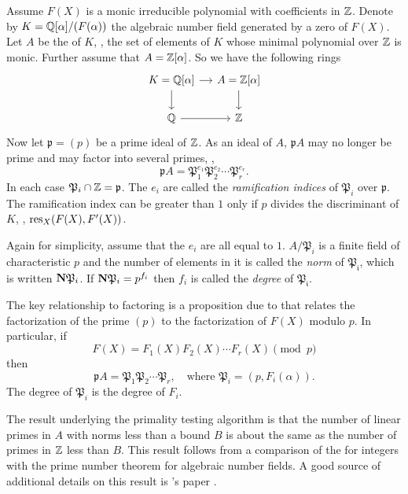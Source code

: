 Assume $F(X)$ is a monic irreducible polynomial with coefficients in
$\mathbb{Z}$.  Denote by $K = \mathbb{Q}[\alpha]/(F(\alpha))$ the algebraic number field
generated by a zero of $F(X)$.  Let $A$ be the 
of $K$, \ie, the set of elements of $K$ whose minimal polynomial over
$\mathbb{Z}$ is monic.  Further assume that $A = \mathbb{Z}[\alpha]$.  So we have the
following rings
\[
\begin{tikzcd}[column sep=small]
K =\Q[\alpha] \arrow{r}\arrow{d}   & A =\Z[\alpha]\arrow{d}\\
\Q\arrow{r} & \Z
\end{tikzcd}
\]
Now let $\mathfrak{p} = (p)$ be a prime ideal of $\mathbb{Z}$.  As an ideal of
$A$, $\mathfrak{p}A$ may no longer be prime and may factor into several
primes, \ie, 
\[
\mathfrak{p}A = \mathfrak{P}_1^{e_1} \mathfrak{P}_2^{e_2} \cdots \mathfrak{P}_r^{e_r}.
\]
In each case $\mathfrak{P}_i \cap \mathbb{Z} = \mathfrak{p}$.  The $e_i$ are called
the {\em ramification indices} of $\mathfrak{P}_i$
over $\mathfrak{p}$.  The ramification index can be greater than $1$ only
if $p$ divides the discriminant of $K$, \ie, $\mathop{\rm res}\nolimits_X(F(X), F'(X))$.

Again for simplicity, assume that the $e_i$ are all equal to $1$.
$A/\mathfrak{P}_i$ is a finite field of characteristic $p$ and the number
of elements in it is called the {\em norm} of $\mathfrak{P_i}$,
 which is written ${\bf N} \mathfrak{P}_i$.  If
${\bf N} \mathfrak{P}_i = p^{f_i}$ then $f_i$ is called the {\em degree}
of $\mathfrak{P_i}$.

The key relationship to factoring is a proposition due to {\Dedekind}
\cite{Dedekind78} that relates the factorization of the prime $(p)$ to the
factorization of $F(X)$ modulo $p$.  In particular, if
\[
F(X) = F_1(X) F_2(X) \cdots F_r(X) \pmod{p}
\]
then
\[
\mathfrak{p}A = \mathfrak{P}_1 \mathfrak{P}_2 \cdots \mathfrak{P}_r,
\quad\mbox{where $\mathfrak{P}_i = (p, F_i(\alpha))$.}
\]
The degree of $\mathfrak{P}_i$ is the degree of $F_i$.

The result underlying the primality testing algorithm is that the
number of linear primes in $A$ with norms less than a bound $B$ is
about the same as the number of primes in $\mathbb{Z}$ less than $B$.  This
result follows from a comparison of the 
for integers with the prime number theorem for algebraic number
fields.  A good source of additional details on this result is
{\Heilbronn}'s paper \cite{Heilbronn67}.

